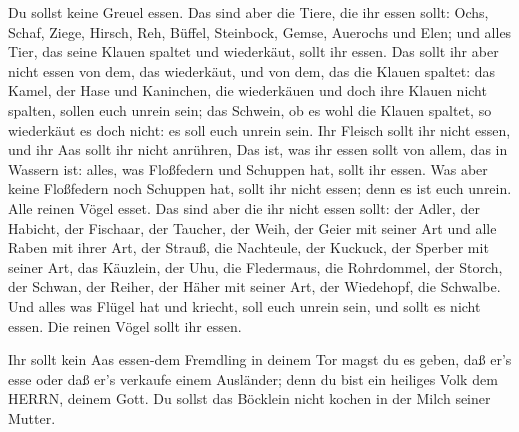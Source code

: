  Du sollst keine Greuel essen.  Das sind aber
die Tiere, die ihr essen sollt: Ochs, Schaf, Ziege,  Hirsch,
Reh, Büffel, Steinbock, Gemse, Auerochs und Elen;  und alles
Tier, das seine Klauen spaltet und wiederkäut, sollt ihr essen.
 Das sollt ihr aber nicht essen von dem, das wiederkäut, und
von dem, das die Klauen spaltet: das Kamel, der Hase und Kaninchen, die
wiederkäuen und doch ihre Klauen nicht spalten, sollen euch unrein sein;
 das Schwein, ob es wohl die Klauen spaltet, so wiederkäut
es doch nicht: es soll euch unrein sein. Ihr Fleisch sollt ihr nicht
essen, und ihr Aas sollt ihr nicht anrühren,  Das ist, was
ihr essen sollt von allem, das in Wassern ist: alles, was Floßfedern und
Schuppen hat, sollt ihr essen.  Was aber keine Floßfedern
noch Schuppen hat, sollt ihr nicht essen; denn es ist euch unrein.
 Alle reinen Vögel esset.  Das sind aber die
ihr nicht essen sollt: der Adler, der Habicht, der Fischaar,
 der Taucher, der Weih, der Geier mit seiner Art
 und alle Raben mit ihrer Art,  der Strauß,
die Nachteule, der Kuckuck, der Sperber mit seiner Art, 
das Käuzlein, der Uhu, die Fledermaus,  die Rohrdommel, der
Storch, der Schwan,  der Reiher, der Häher mit seiner Art,
der Wiedehopf, die Schwalbe.  Und alles was Flügel hat und
kriecht, soll euch unrein sein, und sollt es nicht essen. 
Die reinen Vögel sollt ihr essen.

 Ihr sollt kein Aas essen-dem Fremdling in deinem Tor magst
du es geben, daß er's esse oder daß er's verkaufe einem Ausländer; denn
du bist ein heiliges Volk dem HERRN, deinem Gott. Du sollst das Böcklein
nicht kochen in der Milch seiner Mutter.

